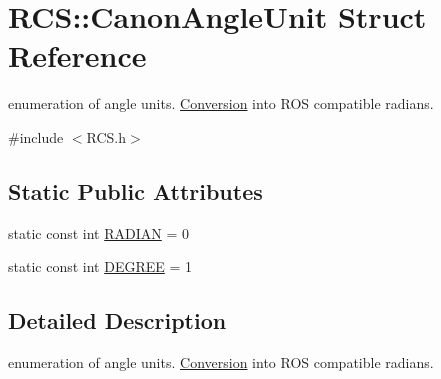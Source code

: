 \hypertarget{structRCS_1_1CanonAngleUnit}{\section{R\-C\-S\-:\-:Canon\-Angle\-Unit Struct Reference}
\label{structRCS_1_1CanonAngleUnit}
}


enumeration of angle units. \hyperlink{namespaceConversion}{Conversion} into R\-O\-S compatible radians.  




{\ttfamily \#include $<$R\-C\-S.\-h$>$}

\subsection*{Static Public Attributes}
\begin{DoxyCompactItemize}
\item 
static const int \hyperlink{structRCS_1_1CanonAngleUnit_a2ce063b43cdf08df392c41de9918bb78}{R\-A\-D\-I\-A\-N} = 0
\item 
static const int \hyperlink{structRCS_1_1CanonAngleUnit_a4b3cdd4b5b779ab93d39a83af474556b}{D\-E\-G\-R\-E\-E} = 1
\end{DoxyCompactItemize}


\subsection{Detailed Description}
enumeration of angle units. \hyperlink{namespaceConversion}{Conversion} into R\-O\-S compatible radians. 

